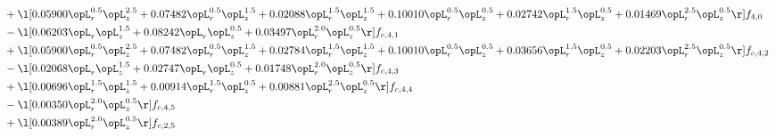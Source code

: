 \begin{alignat}{2}
& + \l[  0.05900 \opL_r^{0.5} \opL_z^{2.5} +  0.07482 \opL_r^{0.5} \opL_z^{1.5} +  0.02088 \opL_r^{1.5} \opL_z^{1.5} +  0.10010 \opL_r^{0.5} \opL_z^{0.5} +  0.02742 \opL_r^{1.5} \opL_z^{0.5} +  0.01469 \opL_r^{2.5} \opL_z^{0.5}  \r] f_{4,0} \nonumber \\ 
& - \l[  0.06203 \opL_r \opL_z^{1.5} +  0.08242 \opL_r \opL_z^{0.5} +  0.03497 \opL_r^{2.0} \opL_z^{0.5}  \r] f_{c,4,1} \nonumber \\ 
& + \l[  0.05900 \opL_r^{0.5} \opL_z^{2.5} +  0.07482 \opL_r^{0.5} \opL_z^{1.5} +  0.02784 \opL_r^{1.5} \opL_z^{1.5} +  0.10010 \opL_r^{0.5} \opL_z^{0.5} +  0.03656 \opL_r^{1.5} \opL_z^{0.5} +  0.02203 \opL_r^{2.5} \opL_z^{0.5}  \r] f_{c,4,2} \nonumber \\ 
& - \l[  0.02068 \opL_r \opL_z^{1.5} +  0.02747 \opL_r \opL_z^{0.5} +  0.01748 \opL_r^{2.0} \opL_z^{0.5}  \r] f_{c,4,3} \nonumber \\ 
& + \l[  0.00696 \opL_r^{1.5} \opL_z^{1.5} +  0.00914 \opL_r^{1.5} \opL_z^{0.5} +  0.00881 \opL_r^{2.5} \opL_z^{0.5}  \r] f_{c,4,4} \nonumber \\ 
& - \l[  0.00350 \opL_r^{2.0} \opL_z^{0.5}  \r] f_{c,4,5} \nonumber \\ 
& + \l[  0.00389 \opL_r^{2.0} \opL_z^{0.5}  \r] f_{c,2,5} \nonumber \\ 
\end{alignat} 


